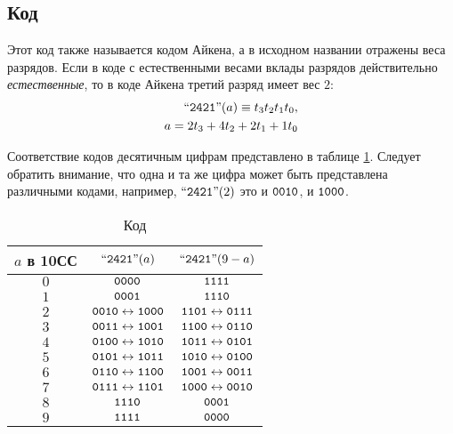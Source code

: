 \subsection{Код \AikenLabel}

Этот код также называется кодом Айкена, а в исходном названии отражены веса разрядов. Если в коде с естественными весами {\NaturalLabel} вклады разрядов действительно \emph{естественные}, то в коде Айкена третий разряд имеет вес $2$: 
\begin{align*}
    \text{``\texttt{2421}''}(a)\equiv t_{3}t_{2}t_{1}t_{0},\\ 
    a=2t_{3}+4t_{2}+2t_{1}+1t_{0}
\end{align*}

Соответствие кодов десятичным цифрам представлено в таблице \ref{t:bcd:Aiken}. Следует обратить внимание, что одна и та же цифра может быть представлена различными кодами, например, $\text{``\texttt{2421}''}(2)$ это и $\texttt{0010}$, и $\texttt{1000}$.
    
\begin{table}[!ht]
    \caption{Код \AikenLabel}
    \label{t:bcd:Aiken}
    \centering
    \begin{tabular}{|c|c|c|}
        \hline\hline
        $a$ в 10СС  & $\text{``\texttt{2421}''}(a)$                                   & $\text{``\texttt{2421}''}(9-a)$\\
        \hline\hline
        $0$         & $\texttt{0000}$                               & $\texttt{1111}$ \\
        $1$         & $\texttt{0001}$                               & $\texttt{1110}$ \\
        $2$         & $\texttt{0010}\leftrightarrow\texttt{1000}$   & $\texttt{1101}\leftrightarrow\texttt{0111}$ \\
        $3$         & $\texttt{0011}\leftrightarrow\texttt{1001}$   & $\texttt{1100}\leftrightarrow\texttt{0110}$ \\
        $4$         & $\texttt{0100}\leftrightarrow\texttt{1010}$   & $\texttt{1011}\leftrightarrow\texttt{0101}$ \\
        $5$         & $\texttt{0101}\leftrightarrow\texttt{1011}$   & $\texttt{1010}\leftrightarrow\texttt{0100}$ \\
        $6$         & $\texttt{0110}\leftrightarrow\texttt{1100}$   & $\texttt{1001}\leftrightarrow\texttt{0011}$ \\
        $7$         & $\texttt{0111}\leftrightarrow\texttt{1101}$   & $\texttt{1000}\leftrightarrow\texttt{0010}$ \\
        $8$         & $\texttt{1110}$                               & $\texttt{0001}$ \\
        $9$         & $\texttt{1111}$                               & $\texttt{0000}$ \\
        \hline
    \end{tabular}
\end{table}

